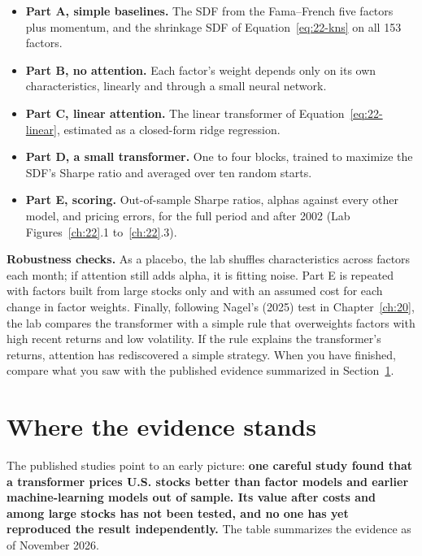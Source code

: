\begin{itemize}
  \item \textbf{Part A, simple baselines.} The SDF from the Fama--French five factors plus momentum, and the shrinkage SDF of Equation~\eqref{eq:22-kns} on all 153 factors.
  \item \textbf{Part B, no attention.} Each factor's weight depends only on its own characteristics, linearly and through a small neural network.
  \item \textbf{Part C, linear attention.} The linear transformer of Equation~\eqref{eq:22-linear}, estimated as a closed-form ridge regression.
  \item \textbf{Part D, a small transformer.} One to four blocks, trained to maximize the SDF's Sharpe ratio and averaged over ten random starts.
  \item \textbf{Part E, scoring.} Out-of-sample Sharpe ratios, alphas against every other model, and pricing errors, for the full period and after 2002 (Lab Figures~\ref{ch:22}.1 to~\ref{ch:22}.3).
\end{itemize}


\label{sec:22-stress}
\textbf{Robustness checks.} As a placebo, the lab shuffles characteristics across factors each month; if attention still adds alpha, it is fitting noise. Part E is repeated with factors built from large stocks only and with an assumed cost for each change in factor weights. Finally, following Nagel's (2025) test in Chapter~\ref{ch:20}, the lab compares the transformer with a simple rule that overweights factors with high recent returns and low volatility. If the rule explains the transformer's returns, attention has rediscovered a simple strategy. When you have finished, compare what you saw with the published evidence summarized in Section~\ref{sec:22-verdict}.

\section{Where the evidence stands}
\label{sec:22-verdict}

The published studies point to an early picture: \textbf{one careful study found that a transformer prices U.S. stocks better than factor models and earlier machine-learning models out of sample. Its value after costs and among large stocks has not been tested, and no one has yet reproduced the result independently.} The table summarizes the evidence as of November 2026.

